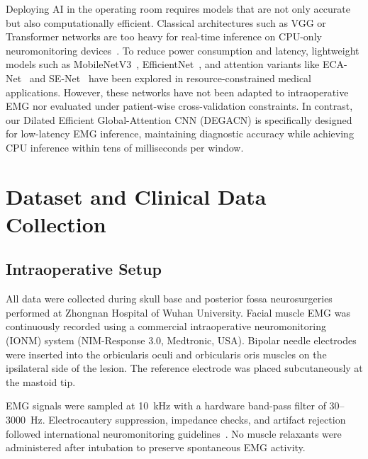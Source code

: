 \documentclass[10pt]{article}
\begin{document}
Deploying AI in the operating room requires models that are not only accurate but also computationally efficient. Classical architectures such as VGG or Transformer networks are too heavy for real-time inference on CPU-only neuromonitoring devices~\cite{RealTime_AI_OR_2023}. To reduce power consumption and latency, lightweight models such as MobileNetV3~\cite{MobileNetV3_2019}, EfficientNet~\cite{EfficientNet_2019}, and attention variants like ECA-Net~\cite{ECA_Net_2020} and SE-Net~\cite{SE_Net_2018} have been explored in resource-constrained medical applications. However, these networks have not been adapted to intraoperative EMG nor evaluated under patient-wise cross-validation constraints. In contrast, our Dilated Efficient Global-Attention CNN (DEGACN) is specifically designed for low-latency EMG inference, maintaining diagnostic accuracy while achieving CPU inference within tens of milliseconds per window.

\section{Dataset and Clinical Data Collection}

\subsection{Intraoperative Setup}
All data were collected during skull base and posterior fossa neurosurgeries performed at Zhongnan Hospital of Wuhan University. Facial muscle EMG was continuously recorded using a commercial intraoperative neuromonitoring (IONM) system (NIM-Response 3.0, Medtronic, USA). Bipolar needle electrodes were inserted into the orbicularis oculi and orbicularis oris muscles on the ipsilateral side of the lesion. The reference electrode was placed subcutaneously at the mastoid tip.

EMG signals were sampled at \SI{10}{\kilo\hertz} with a hardware band-pass filter of 30–3000~Hz. Electrocautery suppression, impedance checks, and artifact rejection followed international neuromonitoring guidelines~\cite{Thyroid_cIONM_Guideline_2018}. No muscle relaxants were administered after intubation to preserve spontaneous EMG activity.
\end{document}
